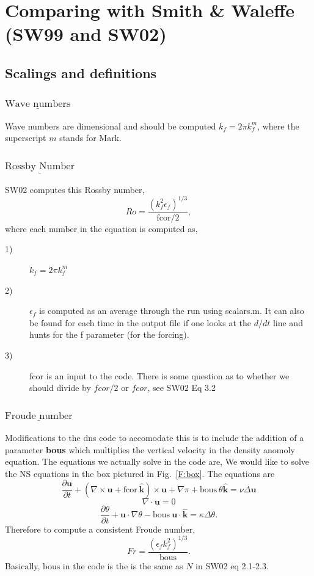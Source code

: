 \documentclass[12pt]{article}
\newcommand{\khat}{\hat{\mathbf k}}
\newcommand{\uv}{\mathbf u}
\newcommand{\grad}{\nabla}
\newcommand{\curl}{\grad \times}
\begin{document}
\noindent

\section{Comparing with Smith \& Waleffe (SW99 and SW02)}

\subsection{Scalings and definitions}

\subsubsection*{$\underline{\text{Wave numbers}}$}
Wave numbers are dimensional and should be computed $k_f = 2 \pi
k_f^m$, where the superscript $m$ stands for Mark. 

\subsubsection*{$\underline{\text{Rossby Number}}$}
SW02 computes this Rossby number,
\begin{equation}
  Ro = \frac{(k_f^2 \epsilon_f)^{1/3}}{\text{fcor}/2}, 
\end{equation}
where each number in the equation is computed as,
\begin{description}
   \item[1)] $k_f = 2 \pi k_f^m$
   \item[2)] $\epsilon_f$ is computed as an average through the run using
     scalars.m. It can also be found for each time in the output file
     if one looks at the $d/dt$ line and hunts for the f parameter (for
     the forcing).
  \item[3)] fcor is an input to the code. There is some question as to
    whether we should divide by $fcor/2$ or $fcor$, see SW02 Eq 3.2

\end{description}

\subsubsection*{$\underline{\text{Froude number}}$}

Modifications to the dns code to accomodate this is to include the
addition of a parameter {\bf{bous}} which multiplies the vertical
velocity in the  density anomoly equation. The equations we actually
solve in the code are,
We would like to solve the NS equations in the box pictured in
Fig.~\ref{F:box}.  The equations are
\[ 
\frac{ \partial  \uv }{\partial t}  + (\curl \uv + \text{fcor} ~\khat) \times \uv
+  
\grad \pi + \text{bous}~ \theta \khat = \nu \Delta \uv 
\] 
\[ 
\grad \cdot \uv = 0 
\] 
\[ 
\frac{ \partial  \theta }{\partial t}  + \uv \cdot \grad \theta -  
\text{bous} ~\uv \cdot \khat = \kappa \Delta \theta.
\] 
Therefore to compute a consistent Froude number,
\begin{equation}
Fr = \frac{(\epsilon_f k_f^2)^{1/3}}{\text{bous}}.
\end{equation}
Basically, $\text{bous}$ in the code is the is the same as $N$ in SW02 eq
2.1-2.3.
\end{document}
